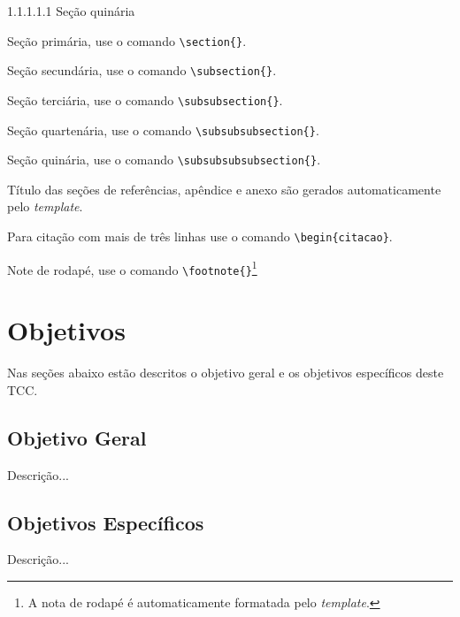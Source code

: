 1.1.1.1.1 Seção quinária

\vspace{12pt}

\begin{alineas}
    \item Seção primária, use o comando \verb|\section{}|.
    \item Seção secundária, use o comando \verb|\subsection{}|.
    \item Seção terciária, use o comando \verb|\subsubsection{}|.
    \item Seção quartenária, use o comando \verb|\subsubsubsection{}|.
    \item Seção quinária, use o comando \verb|\subsubsubsubsection{}|.
    \item Título das seções de referências, apêndice e anexo são gerados automaticamente pelo \textit{template}.
    \item Para citação com mais de três linhas use o comando \verb|\begin{citacao}|.
    \item Note de rodapé, use o comando \verb|\footnote{}|\footnote{A nota de rodapé é automaticamente formatada pelo \textit{template}.}
\end{alineas}

\section{Objetivos}


Nas seções abaixo estão descritos o objetivo geral e os objetivos específicos deste TCC.


\subsection{Objetivo Geral}


Descrição...


\subsection{Objetivos Específicos}


Descrição...